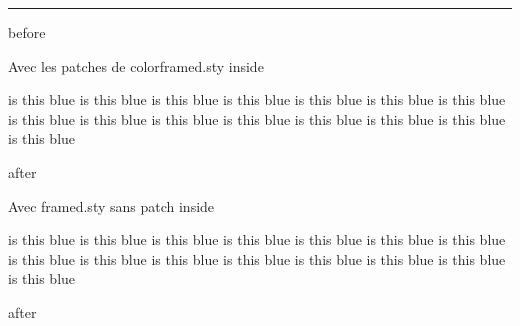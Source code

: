 \documentclass[a4paper]{article}
\let\originalCustomFBox\CustomFBox
\begin{document}

\vspace*{18cm}

\hrule

before

\begin{titled-frame}{Avec les patches de colorframed.sty}
  inside

  \color{blue}
  is this blue
  is this blue
  is this blue
  is this blue
  is this blue
  is this blue
  is this blue
  is this blue
  is this blue
  is this blue
  is this blue
  is this blue
  is this blue
  is this blue
  is this blue
\end{titled-frame}

after
\vspace*{15.8cm}

\let\CustomFBox\originalCustomFBox
\LetLtxMacro\TitleBarFrame\originalTitleBarFrame
\begin{titled-frame}{Avec framed.sty sans patch}
  inside

  \color{blue}
  is this blue
  is this blue
  is this blue
  is this blue
  is this blue
  is this blue
  is this blue
  is this blue
  is this blue
  is this blue
  is this blue
  is this blue
  is this blue
  is this blue
  is this blue
\end{titled-frame}

after
\end{document}
